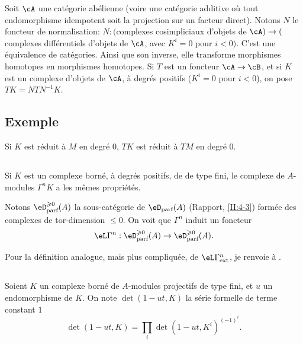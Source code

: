 Soit $\cA$ une catégorie abélienne (voire une catégorie additive où 
tout endomorphisme idempotent soit la projection sur un facteur direct). Notons 
$N$ le foncteur de normalisation: $N:($complexes cosimpliciaux d'objets de 
$\cA)\to($complexes différentiels d'objets de $\cA$, avec $K^i=0$ pour 
$i<0)$. C'est une équivalence de catégories. Ainsi que son inverse, elle 
transforme morphismes homotopes en morphismes homotopes. Si $T$ est un foncteur 
$\cA\to\cB$, et si $K$ est un complexe d'objets de $\cA$, à degrés 
positifs ($K^i=0$ pour $i<0$), on pose $T K=N T N^{-1} K$. 





\subsection{Exemple}\label{III:1-5}

Si $K$ est réduit à $M$ en degré $0$, $T K$ est réduit à $T M$ en 
degré $0$. 





\subsection{}\label{III:1-6}

Si $K$ est un complexe borné, à degrés positifs, de  
de type fini, le complexe de $A$-modules $\Gamma^n K$ a les mêmes 
propriétés. 

Notons $\eD_\text{parf}^{\geqslant 0}(A)$ la sous-catégorie de 
$\eD_\text{parf}(A)$ (Rapport, \ref{II:4-3}) formée des complexes de 
tor-dimension $\leqslant 0$. On voit que $\Gamma^n$ induit un foncteur 
\[
  \eL\Gamma^n : \eD_\text{parf}^{\geqslant 0}(A) \to \eD_\text{parf}^{\geqslant 0}(A) \text{.}
\]

Pour la définition analogue, mais plus compliquée, de 
$\eL\Gamma_\text{ext}^n$, je renvoie à . 





\subsection{}\label{III:1-7}

Soient $K$ un complexe borné de $A$-modules projectifs de type fini, et $u$ 
un endomorphisme de $K$. On note $\det(1-u t,K)$ la série formelle de terme 
constant $1$ 
\[
  \det(1-u t,K) = \prod_i \det(1-u t,K^i)^{(-1)^i} \text{.}
\]

